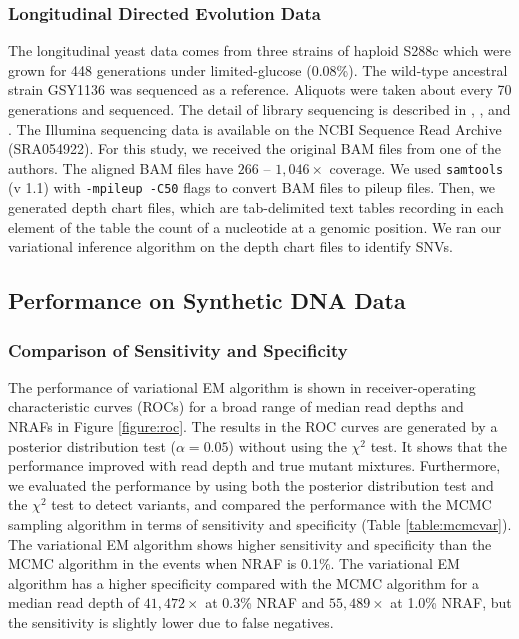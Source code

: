 \documentclass{bmcart}
\begin{document}
\subsubsection{Longitudinal Directed Evolution Data}

The longitudinal yeast data comes from three strains of haploid S288c which were grown for 448 generations under limited-glucose (0.08\%).
The wild-type ancestral strain GSY1136 was sequenced as a reference.
Aliquots were taken about every 70 generations and sequenced.
The detail of library sequencing is described in \cite{kvitek2013whole}, \cite{bansal2010statistical}, and \cite{kao2008molecular}.
The Illumina sequencing data is available on the NCBI Sequence Read Archive (SRA054922)\cite{kvitek2013whole}.
For this study, we received the original BAM files from one of the authors.
The aligned BAM files have $266$ -- $1,046\times$ coverage.
We used \texttt{samtools} (v 1.1) with \texttt{-mpileup -C50} flags to convert BAM files to pileup files.
Then, we generated depth chart files, which are tab-delimited text tables recording in each element of the table the count of a nucleotide at a genomic position.
We ran our variational inference algorithm on the depth chart files to identify SNVs.

\subsection{Performance on Synthetic DNA Data}

\subsubsection{Comparison of Sensitivity and Specificity}
The performance of variational EM algorithm is shown in receiver-operating characteristic curves (ROCs) for a broad range of median read depths and NRAFs in Figure \ref{figure:roc}.
The results in the ROC curves are generated by a posterior distribution test ($\alpha = 0.05$) without using the $\chi^2$ test.
It shows that the performance improved with read depth and true mutant mixtures.
Furthermore, we evaluated the performance by using both the posterior distribution test and the $\chi^2$ test to detect variants, and compared the performance with the MCMC sampling algorithm in terms of sensitivity and specificity (Table \ref{table:mcmcvar}).
The variational EM algorithm shows higher sensitivity and specificity than the MCMC algorithm in the events when NRAF is 0.1\%.
The variational EM algorithm has a higher specificity compared with the MCMC algorithm for a median read depth of $41,472\times$ at 0.3\% NRAF and $55,489\times$ at 1.0\% NRAF, but the sensitivity is slightly lower due to false negatives.
\end{document}
